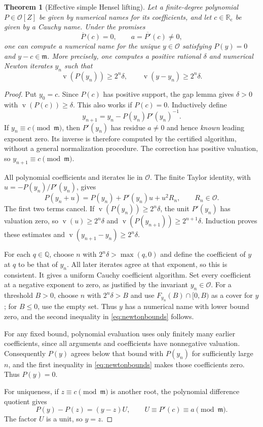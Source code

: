 \documentclass[11pt,letterpaper]{article}
\numberwithin{equation}{section}
\newtheorem{theorem}{Theorem}[section]
\theoremstyle{definition}
\theoremstyle{remark}
\newcommand{\Rc}{\mathbb R_{\mathrm c}}
\newcommand{\Q}{\mathbb Q}
\newcommand{\val}{\operatorname{v}}
\newcommand{\Oh}{\mathcal O}
\newcommand{\mh}{\mathfrak m}
\begin{document}
\begin{theorem}[Effective simple Hensel lifting]
\label{thm:hensel}
Let a finite-degree polynomial $P\in\Oh[Z]$ be given by numerical names for
its coefficients, and let $c\in\Rc$ be given by a Cauchy name. Under the
promises
\[
 \overline P(c)=0,\qquad a=\overline{P'}(c)\ne0,
\]
one can compute a numerical name for the unique $y\in\Oh$ satisfying
$P(y)=0$ and $y-c\in\mh$.
More precisely, one computes a positive rational $\delta$ and numerical
Newton iterates $y_n$ such that
\begin{equation}\label{eq:newtonbounds}
 \val(P(y_n))\ge2^n\delta,\qquad
 \val(y-y_n)\ge2^n\delta.
\end{equation}
\end{theorem}
\begin{proof}
Put $y_0=c$. Since $P(c)$ has positive support, the gap lemma gives
$\delta>0$ with $\val(P(c))\ge\delta$. This also works if $P(c)=0$.
Inductively define
\begin{equation}\label{eq:newton}
 y_{n+1}=y_n-P(y_n)P'(y_n)^{-1}.
\end{equation}
If $y_n\equiv c\pmod\mh$, then $P'(y_n)$ has residue $a\ne0$ and hence
\emph{known} leading exponent zero. Its inverse is therefore computed by
the certified algorithm, without a general normalization procedure.
The correction has positive valuation, so $y_{n+1}\equiv c\pmod\mh$.

All polynomial coefficients and iterates lie in $\Oh$. The finite Taylor
identity, with $u=-P(y_n)/P'(y_n)$, gives
\[
 P(y_n+u)=P(y_n)+P'(y_n)u+u^2R_n,
 \qquad R_n\in\Oh.
\]
The first two terms cancel. If $\val(P(y_n))\ge2^n\delta$, the unit
$P'(y_n)$ has valuation zero, so $\val(u)\ge2^n\delta$ and
$\val(P(y_{n+1}))\ge2^{n+1}\delta$. Induction proves these estimates
and $\val(y_{n+1}-y_n)\ge2^n\delta$.

For each $q\in\Q$, choose $n$ with $2^n\delta>\max(q,0)$ and define the
coefficient of $y$ at $q$ to be that of $y_n$. All later iterates agree at
that exponent, so this is consistent. It gives a uniform Cauchy coefficient
algorithm. Set every coefficient at a negative exponent to zero, as
justified by the invariant $y_n\in\Oh$. For a threshold $B>0$, choose
$n$ with $2^n\delta>B$ and use $F_{y_n}(B)\cap[0,B)$ as a cover for $y$;
for $B\le0$, use the empty set. Thus $y$ has a numerical name with lower
bound zero, and the second inequality in \eqref{eq:newtonbounds} follows.

For any fixed bound, polynomial evaluation uses only finitely many earlier
coefficients, since all arguments and coefficients have nonnegative
valuation. Consequently $P(y)$ agrees below that bound with $P(y_n)$ for
sufficiently large $n$, and the first inequality in
\eqref{eq:newtonbounds} makes those coefficients zero. Thus $P(y)=0$.

For uniqueness, if $z\equiv c\pmod\mh$ is another root, the polynomial
difference quotient gives
\[
 P(y)-P(z)=(y-z)U,\qquad U\equiv P'(c)\equiv a\pmod\mh.
\]
The factor $U$ is a unit, so $y=z$.
\end{proof}
\end{document}

